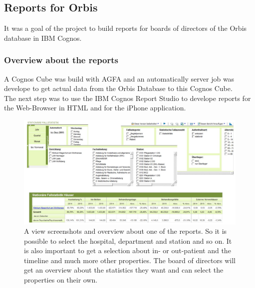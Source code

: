 \documentclass[a4paper]{article}
\begin{document}
	\subsection{Reports for Orbis}
	It was a goal of the project to build reports for boards of directors of the
	Orbis database in IBM Cognos. 
	\subsubsection{Overview about the reports}
	A Cognos Cube was build with AGFA and an automatically server job was develope
	to get actual data from the Orbis Database to this Cognos Cube.\\
	The next step was to use the IBM Cognos Report Studio to develope reports for
	the Web-Browser in HTML and for the iPhone application.
	\begin{figure}[!ht]
		  \centering
		      \includegraphics[width=1.0\textwidth]{reports_overview}
		  \caption{A view screenshots and overview about one of the reports. So it is
		  possible to select the hospital, department and station and so on. It is
		  also important to get a selection about in- or out-patient and the
		  timeline and much more other properties. The board of directors will get an
		  overview about the statistics they want and can select the properties on
		  their own.}
	\end{figure}
\end{document}
